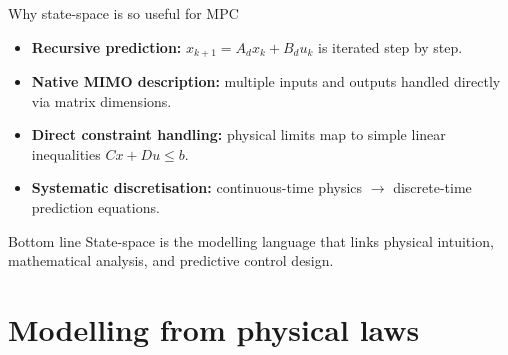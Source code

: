 \documentclass[aspectratio=169,10pt]{beamer}
\begin{document}
\begin{frame}{Why state-space is so useful for MPC}
\begin{itemize}
  \item \textbf{Recursive prediction:}
        $x_{k+1}=A_d x_k + B_d u_k$ is iterated step by step.
  \item \textbf{Native MIMO description:}
        multiple inputs and outputs handled directly via matrix dimensions.
  \item \textbf{Direct constraint handling:}
        physical limits map to simple linear inequalities $Cx + Du \le b$.
  \item \textbf{Systematic discretisation:}
        continuous-time physics $\rightarrow$ discrete-time prediction equations.
\end{itemize}

\begin{alertbox}{Bottom line}
State-space is the modelling language that links physical intuition,
mathematical analysis, and predictive control design.
\end{alertbox}
\end{frame}

\section{Modelling from physical laws}
\end{document}
